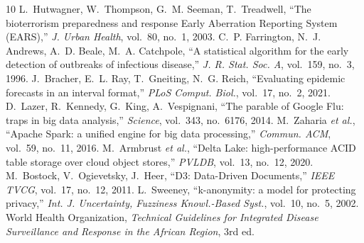 \begin{thebibliography}{10}
 L.~Hutwagner, W.~Thompson, G.~M. Seeman, T.~Treadwell, ``The bioterrorism preparedness and response Early Aberration Reporting System (EARS),'' \emph{J. Urban Health}, vol.~80, no.~1, 2003.
 C.~P. Farrington, N.~J. Andrews, A.~D. Beale, M.~A. Catchpole, ``A statistical algorithm for the early detection of outbreaks of infectious disease,'' \emph{J. R. Stat. Soc. A}, vol.~159, no.~3, 1996.
 J.~Bracher, E.~L. Ray, T.~Gneiting, N.~G. Reich, ``Evaluating epidemic forecasts in an interval format,'' \emph{PLoS Comput. Biol.}, vol.~17, no.~2, 2021.
 D.~Lazer, R.~Kennedy, G.~King, A.~Vespignani, ``The parable of Google Flu: traps in big data analysis,'' \emph{Science}, vol.~343, no.~6176, 2014.
 M.~Zaharia \emph{et al.}, ``Apache Spark: a unified engine for big data processing,'' \emph{Commun. ACM}, vol.~59, no.~11, 2016.
 M.~Armbrust \emph{et al.}, ``Delta Lake: high-performance ACID table storage over cloud object stores,'' \emph{PVLDB}, vol.~13, no.~12, 2020.
 M.~Bostock, V.~Ogievetsky, J.~Heer, ``D3: Data-Driven Documents,'' \emph{IEEE TVCG}, vol.~17, no.~12, 2011.
 L.~Sweeney, ``k-anonymity: a model for protecting privacy,'' \emph{Int. J. Uncertainty, Fuzziness Knowl.-Based Syst.}, vol.~10, no.~5, 2002.
 World Health Organization, \emph{Technical Guidelines for Integrated Disease Surveillance and Response in the African Region}, 3rd ed.
\end{thebibliography}
